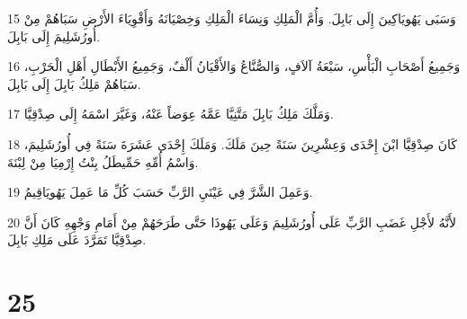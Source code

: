 \par 15 وَسَبَى يَهُويَاكِينَ إِلَى بَابِلَ. وَأُمَّ الْمَلِكِ وَنِسَاءَ الْمَلِكِ وَخِصْيَانَهُ وَأَقْوِيَاءَ الأَرْضِ سَبَاهُمْ مِنْ أُورُشَلِيمَ إِلَى بَابِلَ.
\par 16 وَجَمِيعُ أَصْحَابِ الْبَأْسِ، سَبْعَةُ آلاَفٍ، وَالصُّنَّاعُ وَالأَقْيَانُ أَلْفٌ، وَجَمِيعُ الأَبْطَالِ أَهْلِ الْحَرْبِ، سَبَاهُمْ مَلِكُ بَابِلَ إِلَى بَابِلَ.
\par 17 وَمَلَّكَ مَلِكُ بَابِلَ مَتَّنِيَّا عَمَّهُ عِوَضاً عَنْهُ، وَغَيَّرَ اسْمَهُ إِلَى صِدْقِيَّا.
\par 18 كَانَ صِدْقِيَّا ابْنَ إِحْدَى وَعِشْرِينَ سَنَةً حِينَ مَلَكَ. وَمَلَكَ إِحْدَى عَشَرَةَ سَنَةً فِي أُورُشَلِيمَ، وَاسْمُ أُمِّهِ حَمِّيطَلُ بِنْتُ إِرْمِيَا مِنْ لِبْنَةَ.
\par 19 وَعَمِلَ الشَّرَّ فِي عَيْنَيِ الرَّبِّ حَسَبَ كُلِّ مَا عَمِلَ يَهُويَاقِيمُ.
\par 20 لأَنَّهُ لأَجْلِ غَضَبِ الرَّبِّ عَلَى أُورُشَلِيمَ وَعَلَى يَهُوذَا حَتَّى طَرَحَهُمْ مِنْ أَمَامِ وَجْهِهِ كَانَ أَنَّ صِدْقِيَّا تَمَرَّدَ عَلَى مَلِكِ بَابِلَ.

\chapter{25}

